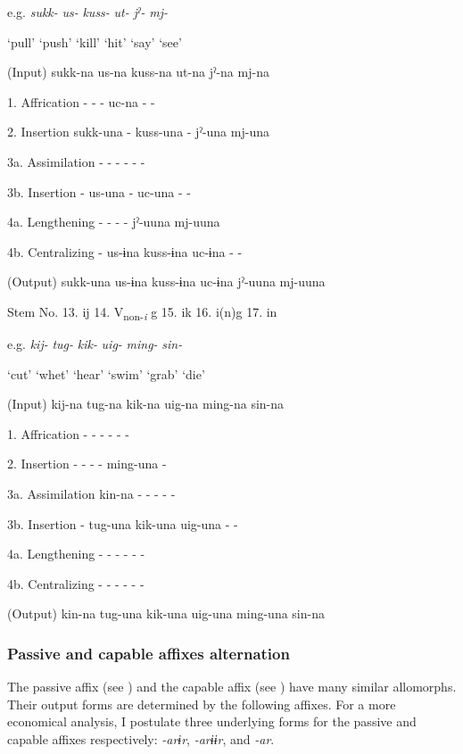 \begin{table}
  e.g.  \textit{sukk-}  \textit{us-}  \textit{kuss-}  \textit{ut-}  \textit{jˀ-}  \textit{mj-}

    ‘pull’  ‘push’  ‘kill’  ‘hit’  ‘say’  ‘see’

  (Input)  sukk-na  us-na  kuss-na  ut-na  jˀ-na  mj-na

1.  Affrication  {}-  {}-  {}-  uc-na  {}-  {}-

2.  Insertion  sukk-una  {}-  kuss-una  {}-  jˀ-una  mj-una

3a.  Assimilation  {}-  {}-  {}-  {}-  {}-  {}-

3b.  Insertion  {}-  us-una  {}-  uc-una  {}-  {}-

4a.  Lengthening  {}-  {}-  {}-  {}-  jˀ-uuna  mj-uuna

4b.  Centralizing  {}-  us-ɨna  kuss-ɨna  uc-ɨna  {}-  {}-

  (Output)  sukk-una  us-ɨna  kuss-ɨna  uc-ɨna  jˀ-uuna  mj-uuna

  Stem No.  13. ij  14. V\textsubscript{non-}\textit{\textsubscript{i}} g  15. ik  16. i(n)g    17. in

  e.g.  \textit{kij-}  \textit{tug-}  \textit{kik-}  \textit{uig-}  \textit{ming-}  \textit{sin-}

    ‘cut’  ‘whet’  ‘hear’  ‘swim’  ‘grab’  ‘die’

  (Input)  kij-na  tug-na  kik-na  uig-na  ming-na  sin-na

1.  Affrication  {}-  {}-  {}-  {}-  {}-  {}-

2.  Insertion  {}-  {}-  {}-  {}-  ming-una  {}-

3a.  Assimilation  kin-na  {}-  {}-  {}-  {}-  {}-

3b.  Insertion  {}-  tug-una  kik-una  uig-una  {}-  {}-

4a.  Lengthening  {}-  {}-  {}-  {}-  {}-  {}-

4b.  Centralizing  {}-  {}-  {}-  {}-  {}-  {}-

  (Output)  kin-na  tug-una  kik-una  uig-una  ming-una  sin-na
\end{table}

\subsubsection{Passive and capable affixes alternation}

The passive affix (see ) and the capable affix (see ) have many similar allomorphs. Their output forms are determined by the following affixes. For a more economical analysis, I postulate three underlying forms for the passive and capable affixes respectively: \textit{{}-arɨr}, \textit{{}-arɨɨr}, and \textit{-ar}.

